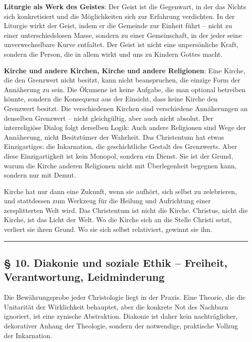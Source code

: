 \documentclass[
  ngerman,
]{article}
\begin{document}
\textbf{Liturgie als Werk des Geistes}: Der Geist ist die Gegenwart, in
der das Nichts sich konkretisiert und die Möglichkeiten sich zur
Erfahrung verdichten. In der Liturgie wirkt der Geist, indem er die
Gemeinde zur Einheit führt -- nicht zu einer unterschiedslosen Masse,
sondern zu einer Gemeinschaft, in der jeder seine unverwechselbare Kurve
entfaltet. Der Geist ist nicht eine unpersönliche Kraft, sondern die
Person, die in allem wirkt und uns zu Kindern Gottes macht.

\textbf{Kirche und andere Kirchen, Kirche und andere Religionen}: Eine
Kirche, die den Grenzwert nicht besitzt, kann nicht beanspruchen, die
einzige Form der Annäherung zu sein. Die Ökumene ist keine Aufgabe, die
man optional betreiben könnte, sondern die Konsequenz aus der Einsicht,
dass keine Kirche den Grenzwert besitzt. Die verschiedenen Kirchen sind
verschiedene Annäherungen an denselben Grenzwert -- nicht gleichgültig,
aber auch nicht absolut. Der interreligiöse Dialog folgt derselben
Logik: Auch andere Religionen sind Wege der Annäherung, nicht
Besitztümer der Wahrheit. Das Christentum hat etwas Einzigartiges: die
Inkarnation, die geschichtliche Gestalt des Grenzwerts. Aber diese
Einzigartigkeit ist kein Monopol, sondern ein Dienst. Sie ist der Grund,
warum die Kirche anderen Religionen nicht mit Überlegenheit begegnen
kann, sondern nur mit Demut.

Kirche hat nur dann eine Zukunft, wenn sie aufhört, sich selbst zu
zelebrieren, und stattdessen zum Werkzeug für die Heilung und
Aufrichtung einer zersplitterten Welt wird. Das Christentum ist nicht
die Kirche. Christus, nicht die Kirche, ist das Licht der Welt. Wo die
Kirche sich an die Stelle Christi setzt, verliert sie ihren Grund. Wo
sie sich selbst relativiert, gewinnt sie ihn.

\begin{center}\rule{0.5\linewidth}{0.5pt}\end{center}

\subsection{§ 10. Diakonie und soziale Ethik -- Freiheit, Verantwortung,
Leidminderung}\label{diakonie-und-soziale-ethik-freiheit-verantwortung-leidminderung}

Die Bewährungsprobe jeder Christologie liegt in der Praxis. Eine
Theorie, die die Unitarität der Wirklichkeit behauptet, aber die
konkrete Not des Nachbarn ignoriert, ist eine zynische Abstraktion.
Diakonie ist daher kein nachträglicher, dekorativer Anhang der
Theologie, sondern der notwendige, praktische Vollzug der Inkarnation.
\end{document}
